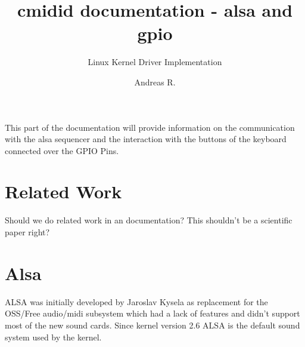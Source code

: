 \documentclass[paper=a4,fontsize=11pt,pagesize,bibtotoc]{scrartcl}
\title{cmidid documentation - alsa and gpio }
\subtitle{Linux Kernel Driver Implementation}
\author{Andreas R.}
\begin{document}
	\maketitle
	
This part of the documentation will provide information on the communication with the alsa sequencer and the interaction with the buttons of the keyboard connected over the GPIO Pins.
\section{Related Work}
Should we do related work in an documentation? This shouldn't be a scientific paper right?

\section{Alsa}
\label{alsa}
ALSA was initially developed by Jaroslav Kysela as replacement for the OSS/Free audio/midi subsystem which had a lack of features and didn't support most of the new sound cards. Since kernel version 2.6 ALSA is the default sound system used by the kernel.
\cite{Phillips:2005:UGA:1080072.1080075}
{}

	
	
\end{document}

